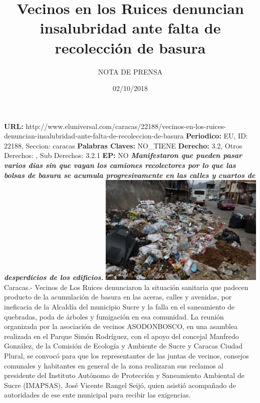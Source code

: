 \documentclass{article}%
\title{\textbf{Vecinos en los Ruices denuncian insalubridad ante falta de recolección de basura}}%
\author{NOTA DE PRENSA}%
\date{02/10/2018}%
\begin{document}
%
\normalsize%
\maketitle%
\textbf{URL: }%
http://www.eluniversal.com/caracas/22188/vecinos{-}en{-}los{-}ruices{-}denuncian{-}insalubridad{-}ante{-}falta{-}de{-}recoleccion{-}de{-}basura\newline%
%
\textbf{Periodico: }%
EU, %
ID: %
22188, %
Seccion: %
caracas\newline%
%
\textbf{Palabras Claves: }%
NO\_TIENE\newline%
%
\textbf{Derecho: }%
3.2, %
Otros Derechos: %
, %
Sub Derechos: %
3.2.1\newline%
%
\textbf{EP: }%
NO\newline%
\newline%
%
\textbf{\textit{Manifestaron que pueden pasar varios días sin que vayan los camiones recolectores por lo que las bolsas de basura se acumula progresivamente en las calles y cuartos de desperdicios de los edificios.}}%
\newline%
\newline%
%
\includegraphics[width=300px]{172.JPG}%
\newline%
%
Caracas.{-} Vecinos de Los Ruices denunciaron la situación sanitaria que padecen producto de la acumulación de basura en las aceras, calles y avenidas, por ineficacia de la Alcaldía del municipio Sucre y la falla en el saneamiento de quebradas, poda de árboles y fumigación en esa comunidad.%
\newline%
%
La reunión organizada por la asociación de vecinos ASODONBOSCO, en una asamblea realizada en el Parque Simón Rodríguez, con el apoyo del concejal Manfredo González, de la Comisión de Ecología y Ambiente de Sucre y Caracas Ciudad Plural, se convocó para que los representantes de las juntas de vecinos, consejos comunales y habitantes en general de la zona realizaran sus reclamos al presidente del Instituto Autónomo de Protección y Saneamiento Ambiental de Sucre (IMAPSAS), José Vicente Rangel Seijó, quien asistió acompañado de autoridades de ese ente municipal para recibir las exigencias.%
\end{document}
